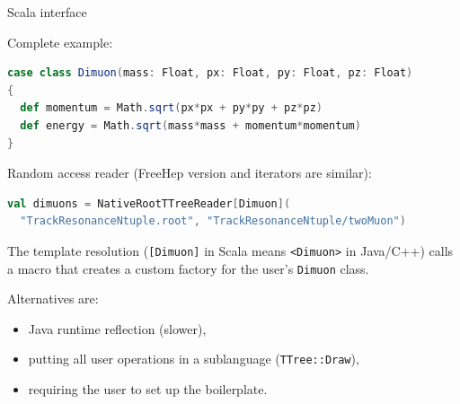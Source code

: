 \documentclass{beamer}
\begin{document}
\begin{frame}[fragile]{Scala interface}

Complete example:

\begin{lstlisting}[language=scala]
case class Dimuon(mass: Float, px: Float, py: Float, pz: Float)
{
  def momentum = Math.sqrt(px*px + py*py + pz*pz)
  def energy = Math.sqrt(mass*mass + momentum*momentum)
}
\end{lstlisting}

Random access reader (FreeHep version and iterators are similar):

\begin{lstlisting}[language=scala]
val dimuons = NativeRootTTreeReader[Dimuon](
  "TrackResonanceNtuple.root", "TrackResonanceNtuple/twoMuon")
\end{lstlisting}

The template resolution ({\tt [Dimuon]} in Scala means {\tt <Dimuon>} in Java/C++) calls a macro that creates a custom factory for the user's {\tt Dimuon} class.

\vspace{0.5\baselineskip}
Alternatives are:
\begin{itemize}
\item Java runtime reflection (slower),
\item putting all user operations in a sublanguage ({\tt TTree::Draw}),
\item requiring the user to set up the boilerplate.
\end{itemize}
\end{frame}
\end{document}
